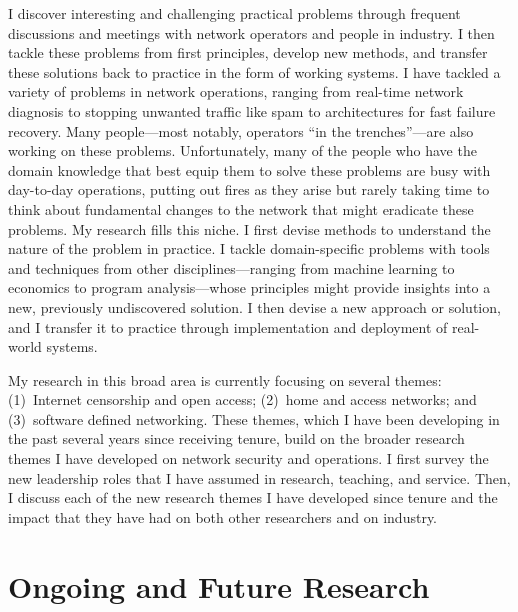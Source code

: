 \documentclass{article}
\begin{document}
I discover interesting and challenging practical problems through
frequent discussions and meetings with network operators and people in
industry.  I then tackle these problems from first principles, develop
new methods, and transfer these solutions back to practice in the form
of working systems.  I have tackled a variety of problems in network
operations, ranging from real-time network diagnosis to stopping
unwanted traffic like spam to architectures for fast failure recovery.
Many people---most notably, operators ``in the trenches''---are also
working on these problems.  Unfortunately, many of the people who have
the domain knowledge that best equip them to solve these problems are
busy with day-to-day operations, putting out fires as they arise but
rarely taking time to think about fundamental changes to the network
that might eradicate these problems.  My research fills this niche.  I
first devise methods to understand the nature of the problem in
practice.  I tackle domain-specific problems with tools and techniques
from other disciplines---ranging from machine learning to economics to
program analysis---whose principles might provide insights into a new,
previously undiscovered solution.  I then devise a new approach or
solution, and I transfer it to practice through implementation and
deployment of real-world systems.

My research in this broad area is currently focusing on several themes:
(1)~Internet censorship and open access; (2)~home and access networks;
and (3)~software defined networking.  These themes, which I have been
developing in the past several years since receiving tenure, build on
the broader research themes I have developed on network security and
operations.  I first survey the new leadership roles that I have assumed
in research, teaching, and service.  Then, I discuss each of the new
research themes I have developed since tenure and the impact that they
have had on both other researchers and on industry.

\section*{Ongoing and Future Research}
\end{document}
